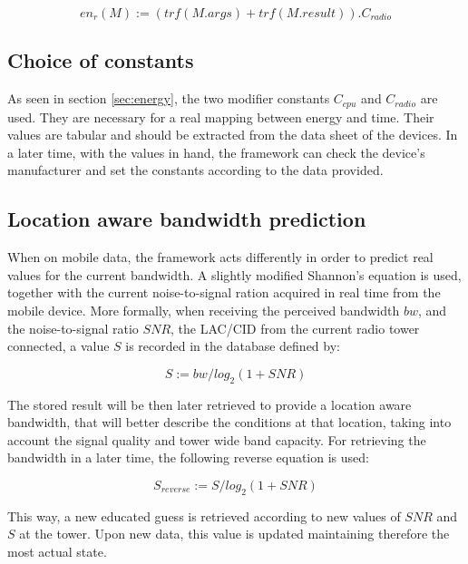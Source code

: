 \documentclass[10pt, conference, letterpaper]{IEEEtran}
\begin{document}
  \begin{equation} \label{eq:energyremote}
    en_{r}(M) := (trf(M.args) + trf(M.result)) . C_{radio}
  \end{equation}

  \subsection{Choice of constants}
  As seen in section \ref{sec:energy}, the two modifier constants $C_{cpu}$ and $C_{radio}$ are used. They are necessary for a real mapping between energy and time. Their values are tabular and should be extracted from the data sheet of the devices. In a later time, with the values in hand, the framework can check the device's manufacturer and set the constants according to the data provided.

  \subsection{Location aware bandwidth prediction}
  When on mobile data, the framework acts differently in order to predict real values for the current bandwidth. A slightly modified Shannon's equation is used, together with the current noise-to-signal ration acquired in real time from the mobile device. More formally, when receiving the perceived bandwidth $bw$, and the noise-to-signal ratio $SNR$, the LAC/CID from the current radio tower connected, a value $S$ is recorded in the database defined by:

  \begin{equation} \label{eq:shannonbw}
    S := bw / log_2(1 + SNR)
  \end{equation}

  The stored result will be then later retrieved to provide a location aware bandwidth, that will better describe the conditions at that location, taking into account the signal quality and tower wide band capacity. For retrieving the bandwidth in a later time, the following reverse equation is used:

  \begin{equation} \label{eq:shannonbw_reverse}
    S_{reverse} := S / log_2(1 + SNR)
  \end{equation}

  This way, a new educated guess is retrieved according to new values of $SNR$ and $S$ at the tower. Upon new data, this value is updated maintaining therefore the most actual state.
\end{document}
